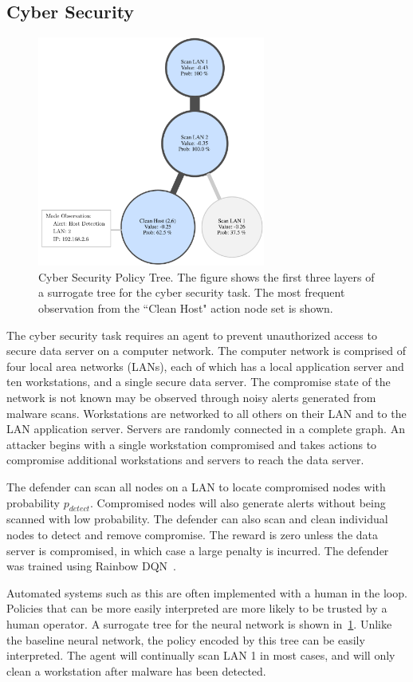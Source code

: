 \documentclass[letterpaper]{article} %
\begin{document}
\subsection{Cyber Security}
\begin{figure}[t]
\centering
\includegraphics[width=0.891\columnwidth,height=2.98in ]{figs/cyber_tree.pdf}
\caption{Cyber Security Policy Tree. The figure shows the first three layers of a surrogate tree for the cyber security task. The most frequent observation from the ``Clean Host" action node set is shown.}
\label{fig: cyber tree}
\end{figure}
The cyber security task requires an agent to prevent unauthorized access to secure data server on a computer network.
The computer network is comprised of four local area networks (LANs), each of which has a local application server and ten workstations, and a single secure data server.
The compromise state of the network is not known may be observed through noisy alerts generated from malware scans.
Workstations are networked to all others on their LAN and to the LAN application server.
Servers are randomly connected in a complete graph.
An attacker begins with a single workstation compromised and takes actions to compromise additional workstations and servers to reach the data server.

The defender can scan all nodes on a LAN to locate compromised nodes with probability $p_{detect}$.
Compromised nodes will also generate alerts without being scanned with low probability.
The defender can also scan and clean individual nodes to detect and remove compromise.
The reward is zero unless the data server is compromised, in which case a large penalty is incurred.
The defender was trained using Rainbow DQN~\cite{hessel2018}.

Automated systems such as this are often implemented with a human in the loop.
Policies that can be more easily interpreted are more likely to be trusted by a human operator.
A surrogate tree for the neural network is shown in~\cref{fig: cyber tree}.
Unlike the baseline neural network, the policy encoded by this tree can be easily interpreted.
The agent will continually scan LAN 1 in most cases, and will only clean a workstation after malware has been detected.
\end{document}

